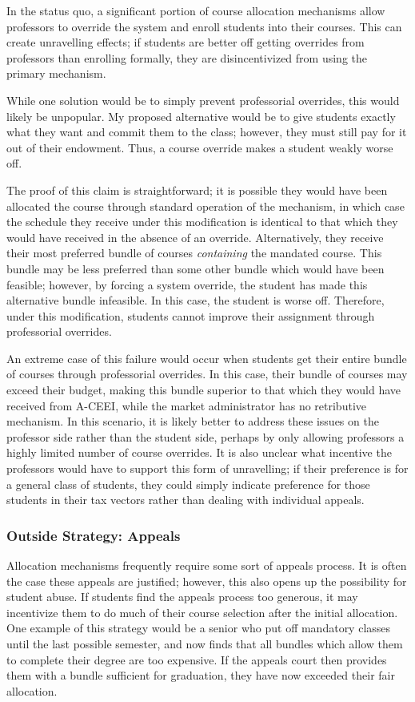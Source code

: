 \documentclass{article}
\begin{document}
In the status quo, a significant portion of course allocation mechanisms allow professors to override the system and enroll students into their courses. This can create unravelling effects; if students are better off getting overrides from professors than enrolling formally, they are disincentivized from using the primary mechanism. 

While one solution would be to simply prevent professorial overrides, this would likely be unpopular. My proposed alternative would be to give students exactly what they want and commit them to the class; however, they must still pay for it out of their endowment. Thus, a course override makes a student weakly worse off. 

The proof of this claim is straightforward; it is possible they would have been allocated the course through standard operation of the mechanism, in which case the schedule they receive under this modification is identical to that which they would have received in the absence of an override. Alternatively, they receive their most preferred bundle of courses \emph{containing} the mandated course. This bundle may be less preferred than some other bundle which would have been feasible; however, by forcing a system override, the student has made this alternative bundle infeasible. In this case, the student is worse off. Therefore, under this modification, students cannot improve their assignment through professorial overrides.

An extreme case of this failure would occur when students get their entire bundle of courses through professorial overrides. In this case, their bundle of courses may exceed their budget, making this bundle superior to that which they would have received from A-CEEI, while the market administrator has no retributive mechanism. In this scenario, it is likely better to address these issues on the professor side rather than the student side, perhaps by only allowing professors a highly limited number of course overrides. It is also unclear what incentive the professors would have to support this form of unravelling; if their preference is for a general class of students, they could simply indicate preference for those students in their tax vectors rather than dealing with individual appeals. 

\subsubsection{Outside Strategy: Appeals}
Allocation mechanisms frequently require some sort of appeals process. It is often the case these appeals are justified; however, this also opens up the possibility for student abuse. If students find the appeals process too generous, it may incentivize them to do much of their course selection after the initial allocation. One example of this strategy would be a senior who put off mandatory classes until the last possible semester, and now finds that all bundles which allow them to complete their degree are too expensive. If the appeals court then provides them with a bundle sufficient for graduation, they have now exceeded their fair allocation. 
\end{document}
